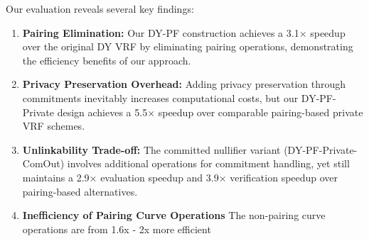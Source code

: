 Our evaluation reveals several key findings:

\begin{enumerate}
    \item \textbf{Pairing Elimination:} Our DY-PF construction achieves a 3.1× speedup over the original DY VRF by eliminating pairing operations, demonstrating the efficiency benefits of our approach.
    
    \item \textbf{Privacy Preservation Overhead:} Adding privacy preservation through commitments inevitably increases computational costs, but our DY-PF-Private design achieves a 5.5× speedup over comparable pairing-based private VRF schemes.
    
    \item \textbf{Unlinkability Trade-off:} The committed nullifier variant (DY-PF-Private-ComOut) involves additional operations for commitment handling, yet still maintains a 2.9× evaluation speedup and 3.9× verification speedup over pairing-based alternatives.

    \item \textbf{Inefficiency of Pairing Curve Operations} The non-pairing curve operations are from 1.6x - 2x more efficient
\end{enumerate}










